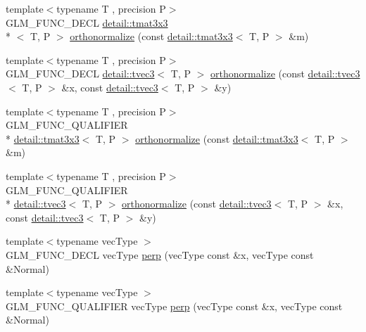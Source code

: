 \begin{DoxyCompactItemize}
{\footnotesize template$<$typename T , precision P$>$ }\\G\-L\-M\-\_\-\-F\-U\-N\-C\-\_\-\-D\-E\-C\-L \hyperlink{structglm_1_1detail_1_1tmat3x3}{detail\-::tmat3x3}\\*
$<$ T, P $>$ \hyperlink{group__gtx__orthonormalize_ga2d615d8b740d7d11e583651c34103e40}{orthonormalize} (const \hyperlink{structglm_1_1detail_1_1tmat3x3}{detail\-::tmat3x3}$<$ T, P $>$ \&m)
\item 
{\footnotesize template$<$typename T , precision P$>$ }\\G\-L\-M\-\_\-\-F\-U\-N\-C\-\_\-\-D\-E\-C\-L \hyperlink{structglm_1_1detail_1_1tvec3}{detail\-::tvec3}$<$ T, P $>$ \hyperlink{group__gtx__orthonormalize_ga41d176cb31fda91b672655c839084b43}{orthonormalize} (const \hyperlink{structglm_1_1detail_1_1tvec3}{detail\-::tvec3}$<$ T, P $>$ \&x, const \hyperlink{structglm_1_1detail_1_1tvec3}{detail\-::tvec3}$<$ T, P $>$ \&y)
\item 
{\footnotesize template$<$typename T , precision P$>$ }\\G\-L\-M\-\_\-\-F\-U\-N\-C\-\_\-\-Q\-U\-A\-L\-I\-F\-I\-E\-R \\*
\hyperlink{structglm_1_1detail_1_1tmat3x3}{detail\-::tmat3x3}$<$ T, P $>$ \hyperlink{group__gtx__orthonormalize_ga2d615d8b740d7d11e583651c34103e40}{orthonormalize} (const \hyperlink{structglm_1_1detail_1_1tmat3x3}{detail\-::tmat3x3}$<$ T, P $>$ \&m)
\item 
{\footnotesize template$<$typename T , precision P$>$ }\\G\-L\-M\-\_\-\-F\-U\-N\-C\-\_\-\-Q\-U\-A\-L\-I\-F\-I\-E\-R \\*
\hyperlink{structglm_1_1detail_1_1tvec3}{detail\-::tvec3}$<$ T, P $>$ \hyperlink{group__gtx__orthonormalize_ga41d176cb31fda91b672655c839084b43}{orthonormalize} (const \hyperlink{structglm_1_1detail_1_1tvec3}{detail\-::tvec3}$<$ T, P $>$ \&x, const \hyperlink{structglm_1_1detail_1_1tvec3}{detail\-::tvec3}$<$ T, P $>$ \&y)
\item 
{\footnotesize template$<$typename vec\-Type $>$ }\\G\-L\-M\-\_\-\-F\-U\-N\-C\-\_\-\-D\-E\-C\-L vec\-Type \hyperlink{group__gtx__perpendicular_ga41f8c73da9798a18e6b1e32f1e301f07}{perp} (vec\-Type const \&x, vec\-Type const \&Normal)
\item 
{\footnotesize template$<$typename vec\-Type $>$ }\\G\-L\-M\-\_\-\-F\-U\-N\-C\-\_\-\-Q\-U\-A\-L\-I\-F\-I\-E\-R vec\-Type \hyperlink{group__gtx__perpendicular_ga41f8c73da9798a18e6b1e32f1e301f07}{perp} (vec\-Type const \&x, vec\-Type const \&Normal)

\end{DoxyCompactItemize}
